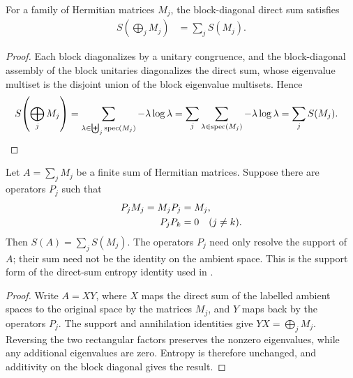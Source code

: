 \begin{theorem}
    \label{thm:entropy_block_diagonal}
    \leanok
    For a family of Hermitian matrices $M_j$, the block-diagonal direct sum
    satisfies
    \begin{align}
        S\!\left(\bigoplus_j M_j\right)
        &=\sum_j S(M_j).
        \label{eq:entropy_block_diagonal}
    \end{align}
\end{theorem}

\begin{proof}\leanok
    Each block diagonalizes by a unitary congruence, and the block-diagonal
    assembly of the block unitaries diagonalizes the direct sum, whose
    eigenvalue multiset is the disjoint union of the block eigenvalue
    multisets. Hence
    \begin{align}
        S\!\left(\bigoplus_j M_j\right)
        &=\sum_{\lambda\in\biguplus_j\mathrm{spec}(M_j)}
          -\lambda\log\lambda
          =\sum_j\sum_{\lambda\in\mathrm{spec}(M_j)}
          -\lambda\log\lambda
          =\sum_j S(M_j).
        \notag
    \end{align}
\end{proof}

\begin{theorem}
    \label{thm:entropy_pairwise_annihilating_support}
    \leanok
    Let $A=\sum_j M_j$ be a finite sum of Hermitian matrices. Suppose there
    are operators $P_j$ such that
    \begin{align}
        P_jM_j=M_jP_j
        &=M_j,
        \notag\\
        P_jP_k
        &=0
        \quad (j\ne k).
        \notag
    \end{align}
    Then $S(A)=\sum_j S(M_j)$. The operators $P_j$ need only resolve the
    support of $A$; their sum need not be the identity on the ambient space.
    This is the support form of the direct-sum entropy identity used in
    \cite[Appendix~C.2, lines~1760--1770]{Cirac2016MPDO_arXiv}.
\end{theorem}

\begin{proof}\leanok
    Write $A=XY$, where $X$ maps the direct sum of the labelled ambient
    spaces to the original space by the matrices $M_j$, and $Y$ maps back by
    the operators $P_j$. The support and annihilation identities give
    $YX=\bigoplus_jM_j$. Reversing the two rectangular factors preserves the
    nonzero eigenvalues, while any additional eigenvalues are zero. Entropy
    is therefore unchanged, and additivity on the block diagonal gives the
    result.
\end{proof}

